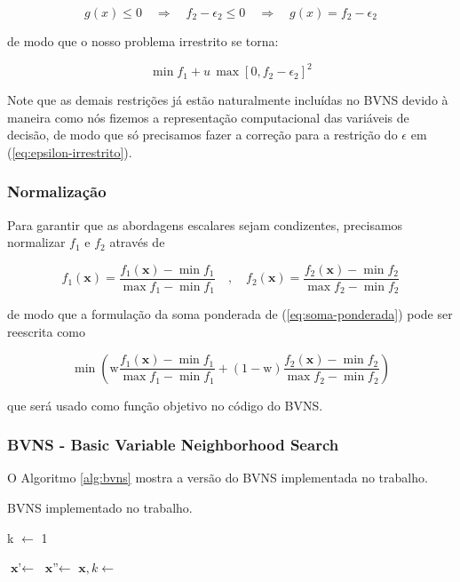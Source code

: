 \documentclass[conference]{IEEEtran}
\begin{document}
\[ g(x) \leq 0 \quad \Longrightarrow \quad f_2 - \epsilon_2 \leq 0 \quad \Longrightarrow \quad g(x) = f_2 - \epsilon_2 \]

\noindent de modo que o nosso problema irrestrito se torna:  


\begin{equation}\label{eq:epsilon-irrestrito}
	\min f_1 + u \, \max \left[ 0, f_2 - \epsilon_2 \right] ^2
\end{equation}

Note que as demais restrições já estão naturalmente incluídas no BVNS devido 
à maneira como nós fizemos a representação computacional das variáveis de decisão, 
de modo que só precisamos fazer a correção para a restrição do $\epsilon$
em (\ref{eq:epsilon-irrestrito}).



\subsubsection{Normalização}

Para garantir que as abordagens escalares sejam condizentes, precisamos normalizar $f_1$ e $f_2$ 
através de 

\begin{equation} \label{eq:normalizacao}
	f_1(\mathbf{x}) = \frac{f_1(\mathbf{x}) - \min f_1}{\max f_1 - \min f_1}
	\quad , \quad 
	f_2(\mathbf{x}) = \frac{f_2(\mathbf{x}) - \min f_2}{\max f_2 - \min f_2}       
\end{equation}

\noindent de modo que a formulação da soma ponderada de (\ref{eq:soma-ponderada})
pode ser reescrita como  

\[ \min \left( \mathrm{w}\frac{f_1(\mathbf{x}) - \min f_1}{\max f_1 - \min f_1} 
+ (1-\mathrm{w})\frac{f_2(\mathbf{x}) - \min f_2}{\max f_2 - \min f_2}\right)    \]   


\noindent que será usado como função objetivo no código do BVNS.

\subsubsection{BVNS - Basic Variable Neighborhood Search}

O Algoritmo \ref{alg:bvns} mostra a versão do BVNS implementada 
no trabalho.

\begin{algorithm}[H]
	\caption{BVNS implementado no trabalho.}\label{alg:bvns}
	\begin{algorithmic}[1]
			\State k $\gets$ 1

				\State $ \textbf{x'} \gets$  
				\State $ \textbf{x''} \gets$  
				\State $ \textbf{x}, k \gets$  
			\EndWhile
		\EndWhile
	\EndProcedure 
	\end{algorithmic}
\end{algorithm}
\end{document}
